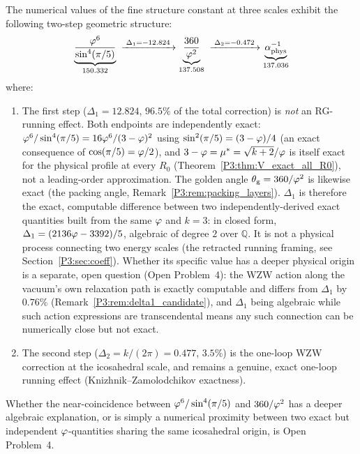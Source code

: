 \begin{result}
\label{P3:prop:cascade}
The numerical values of the fine structure constant at three scales
exhibit the following two-step geometric structure:
\begin{equation}
  \underbrace{\frac{\varphi^6}{\sin^4(\pi/5)}}_{150.332}
  \;\xrightarrow{\;\Delta_1 = -12.824\;}
  \underbrace{\frac{360}{\varphi^2}}_{137.508}
  \;\xrightarrow{\;\Delta_2 = -0.472\;}
  \underbrace{\alpha^{-1}_{\mathrm{phys}}}_{137.036}
  \label{P3:eq:cascade}
\end{equation}
where:
\begin{enumerate}[noitemsep]
  \item The first step ($\Delta_1 = 12.824$, $96.5\%$ of the total
    correction) is \emph{not} an RG-running effect. Both endpoints are
    independently exact: $\varphi^6/\sin^4(\pi/5) = 16\varphi^6/(3-\varphi)^2$ using
    $\sin^2(\pi/5)=(3-\varphi)/4$ (an exact consequence of $\cos(\pi/5)=\varphi/2$),
    and $3-\varphi=\mu^*=\sqrt{k+2}/\varphi$ is itself exact for the physical
    profile at every $R_0$ (Theorem~\ref{P3:thm:V_exact_all_R0}), not a
    leading-order approximation.  The golden angle $\theta_{\mathrm{g}}=360/\varphi^2$ is
    likewise exact (the packing angle, Remark~\ref{P3:rem:packing_layers}).
    $\Delta_1$ is therefore the exact, computable difference between two
    independently-derived exact quantities built from the same $\varphi$ and
    $k=3$: in closed form, $\Delta_1=(2136\varphi-3392)/5$, algebraic of
    degree $2$ over $\mathbb{Q}$. It is not a physical process connecting
    two energy scales (the retracted running framing, see
    Section~\ref{P3:sec:coeff}). Whether its specific value has a deeper
    physical origin is a separate, open question (Open Problem~4): the
    WZW action along the vacuum's own relaxation path is exactly
    computable and differs from $\Delta_1$ by $0.76\%$
    (Remark~\ref{P3:rem:delta1_candidate}), and $\Delta_1$ being
    algebraic while such action expressions are transcendental means
    any such connection can be numerically close but not exact.
  \item The second step ($\Delta_2 = k/(2\pi) = 0.477$, $3.5\%$) is the
    one-loop WZW correction at the icosahedral scale, and remains a
    genuine, exact one-loop running effect (Knizhnik--Zamolodchikov
    exactness).
\end{enumerate}
Whether the near-coincidence between $\varphi^6/\sin^4(\pi/5)$ and
$360/\varphi^2$ has a deeper algebraic explanation, or is simply a numerical
proximity between two exact but independent $\varphi$-quantities sharing the
same icosahedral origin, is Open Problem~4.
\end{result}

